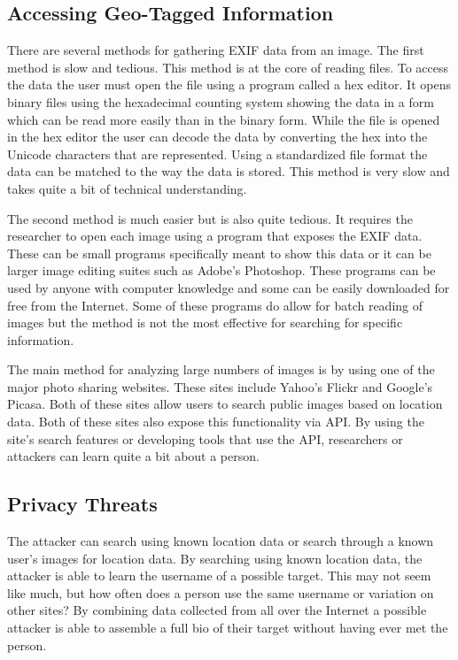 \subsection{Accessing Geo-Tagged Information} 
There are several methods for gathering EXIF data from an image. The first
method is slow and tedious. This method is at the core of reading files. To
access the data the user must open the file using a program called a hex editor.
It opens binary files using the hexadecimal counting system showing the data in
a form which can be read more easily than in the binary form. While the file is
opened in the hex editor the user can decode the data by converting the hex into
the Unicode characters that are represented. Using a standardized file format
the data can be matched to the way the data is stored. This method is very slow
and takes quite a bit of technical understanding.

The second method is much easier but is also quite tedious. It requires the
researcher to open each image using a program that exposes the EXIF data. These
can be small programs specifically meant to show this data or it can be larger
image editing suites such as Adobe's Photoshop. These programs can be used by
anyone with computer knowledge and some can be easily downloaded for free from the
Internet. Some of these programs do allow for batch reading of images but the
method is not the most effective for searching for specific information.

The main method for analyzing large numbers of images is by using one of the
major photo sharing websites. These sites include Yahoo's Flickr and Google's
Picasa. Both of these sites allow users to search public images based on
location data. Both of these sites also expose this functionality via API. By
using the site's search features or developing tools that use the API,
researchers or attackers can learn quite a bit about a person.

\subsection{Privacy Threats} 
The attacker can search using known location data
or search through a known user's images for location data. By searching using
known location data, the attacker is able to learn the username of a possible
target. This may not seem like much, but how often does a person use the same
username or variation on other sites? By combining data collected from all over
the Internet a possible attacker is able to assemble a full bio of their target
without having ever met the person.

